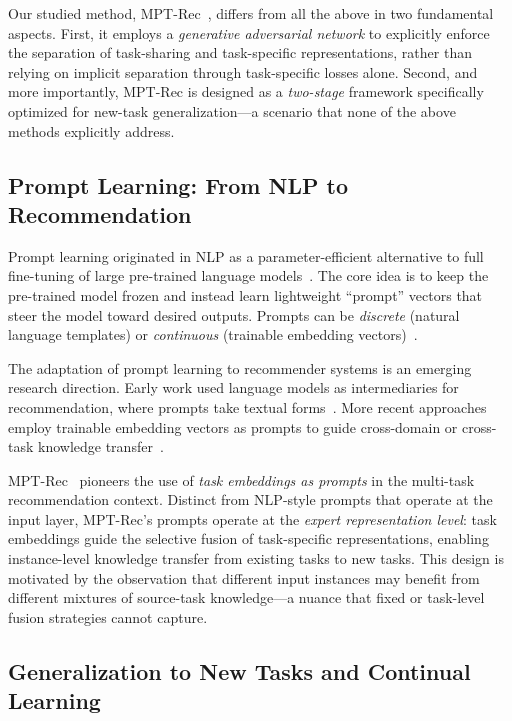 \documentclass[review,anonymous]{acmart}
\begin{document}
Our studied method, MPT-Rec~\cite{bai2025efficient}, differs from all the above in
two fundamental aspects. First, it employs a \emph{generative adversarial network}
to explicitly enforce the separation of task-sharing and task-specific
representations, rather than relying on implicit separation through task-specific
losses alone. Second, and more importantly, MPT-Rec is designed as a
\emph{two-stage} framework specifically optimized for new-task generalization---a
scenario that none of the above methods explicitly address.

\subsection{Prompt Learning: From NLP to Recommendation}

Prompt learning originated in NLP as a parameter-efficient alternative to full
fine-tuning of large pre-trained language models~\cite{lester2021power,li2021prefix,
liu2023hierarchical}. The core idea is to keep the pre-trained model frozen and
instead learn lightweight ``prompt'' vectors that steer the model toward desired
outputs. Prompts can be \emph{discrete} (natural language templates) or
\emph{continuous} (trainable embedding vectors)~\cite{ding2023parameter}.

The adaptation of prompt learning to recommender systems is an emerging research
direction. Early work used language models as intermediaries for recommendation,
where prompts take textual forms~\cite{geng2022recommendation,chu2023leveraging}.
More recent approaches employ trainable embedding vectors as prompts to guide
cross-domain or cross-task knowledge transfer~\cite{hao2024motif,yang2024graphpro,
wang2023plate}.

MPT-Rec~\cite{bai2025efficient} pioneers the use of \emph{task embeddings as
prompts} in the multi-task recommendation context. Distinct from NLP-style prompts
that operate at the input layer, MPT-Rec's prompts operate at the
\emph{expert representation level}: task embeddings guide the selective fusion of
task-specific representations, enabling instance-level knowledge transfer from
existing tasks to new tasks. This design is motivated by the observation that
different input instances may benefit from different mixtures of source-task
knowledge---a nuance that fixed or task-level fusion strategies cannot capture.

\subsection{Generalization to New Tasks and Continual Learning}
\end{document}
